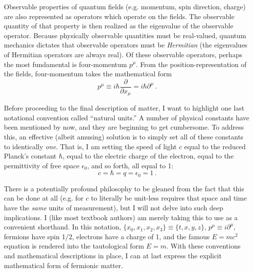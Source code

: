     Observable properties of quantum fields (e.g. momentum, spin direction, charge)
        are also represented as operators which operate on the fields.
    The observable quantity of that property is then realized as the eigenvalue of the observable operator.
    Because physically observable quantities must be real-valued,
        quantum mechanics dictates that observable operators must be \textit{Hermitian}
        (the eigenvalues of Hermitian operators are always real)\cite{Griffiths_book}.
    Of these observable operators, perhaps the most fundamental is four-momentum $p^\mu$.
    From the position-representation of the fields,
        four-momentum takes the mathematical form
    \begin{equation}
        p^\mu \equiv i \hbar \frac{\partial}{\partial x_\mu} = i \hbar \partial^\mu
        \,.
    \end{equation}

    Before proceeding to the final description of matter, I want to highlight one last notational convention called ``natural units.''
    A number of physical constants have been mentioned by now, and they are beginning to get cumbersome.
    To address this, an effective (albeit amusing) solution is to simply set all of these constants to identically \textit{one}.
    That is, I am setting the speed of light $c$ equal to the reduced Planck's constant $\hbar$,
        equal to the electric charge of the electron, equal to the permittivity of free space $\epsilon_0$,
        and so forth, all equal to 1:
    \begin{equation} c=\hbar=q=\epsilon_0=1 \,. \end{equation}

    There is a potentially profound philosophy to be gleaned from the fact that this can be done at all
        (e.g. for $c$ to literally be unit-less requires that space and time have the \textit{same} units of measurement),
        but I will not delve into such deep implications.
    I (like most textbook authors) am merely taking this to use as a convenient shorthand.
    In this notation, $\{x_0, x_1, x_2, x_3\} \equiv \{t,x,y,z\}$,
        $p^\mu \equiv i \partial^\mu$,
        fermions have spin 1/2,
        electrons have a charge of 1,
        and the famous $E=mc^2$ equation is rendered into the tautological form $E=m$.
    With these conventions and mathematical descriptions in place,
        I can at last express the explicit mathematical form of fermionic matter.


